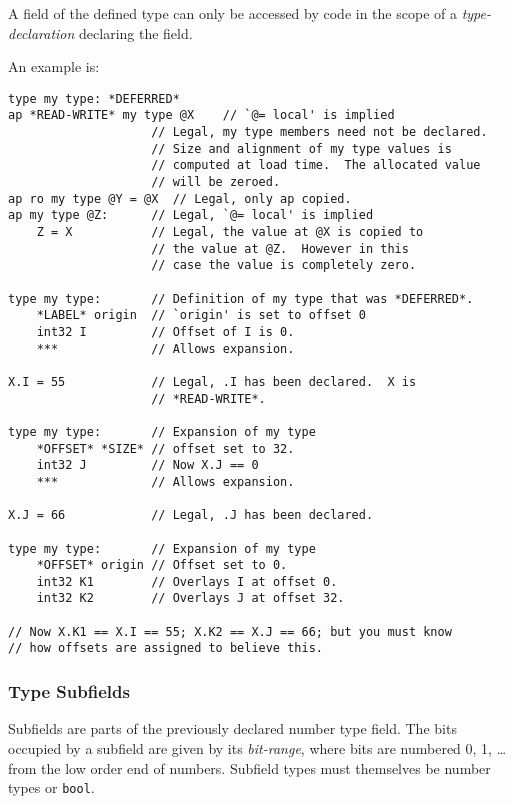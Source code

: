 \documentclass[12pt]{article}
\newenvironment{indpar}[1][0.3in]%
	{\begin{list}{}%
		     {\setlength{\itemsep}{0in}%
		      \setlength{\topsep}{0in}%
		      \setlength{\parsep}{1ex}%
		      \setlength{\labelwidth}{#1}%
		      \setlength{\leftmargin}{#1}%
		      \addtolength{\leftmargin}{\labelsep}}%
	 \item}%
	{\end{list}}
\begin{document}
A field of
the defined type can only be accessed by code in the scope
of a {\em type-declaration} declaring the field.

An example is:

\begin{indpar}\begin{verbatim}
type my type: *DEFERRED*
ap *READ-WRITE* my type @X    // `@= local' is implied
                    // Legal, my type members need not be declared.
                    // Size and alignment of my type values is
                    // computed at load time.  The allocated value
                    // will be zeroed.
ap ro my type @Y = @X  // Legal, only ap copied.
ap my type @Z:      // Legal, `@= local' is implied
    Z = X           // Legal, the value at @X is copied to
                    // the value at @Z.  However in this
                    // case the value is completely zero.

type my type:       // Definition of my type that was *DEFERRED*.
    *LABEL* origin  // `origin' is set to offset 0
    int32 I         // Offset of I is 0.
    ***             // Allows expansion.

X.I = 55            // Legal, .I has been declared.  X is
                    // *READ-WRITE*.

type my type:       // Expansion of my type
    *OFFSET* *SIZE* // offset set to 32.
    int32 J         // Now X.J == 0
    ***             // Allows expansion.

X.J = 66            // Legal, .J has been declared.

type my type:       // Expansion of my type
    *OFFSET* origin // Offset set to 0.
    int32 K1        // Overlays I at offset 0.
    int32 K2        // Overlays J at offset 32.

// Now X.K1 == X.I == 55; X.K2 == X.J == 66; but you must know
// how offsets are assigned to believe this.
\end{verbatim}\end{indpar}

\subsubsection{Type Subfields}

Subfields are parts of the previously declared number type field.
The bits occupied
by a subfield are given by its {\em bit-range}, where bits are numbered
0, 1, \ldots{} from the low order end of numbers.
Subfield types must themselves be number types or {\tt bool}.
\end{document}
